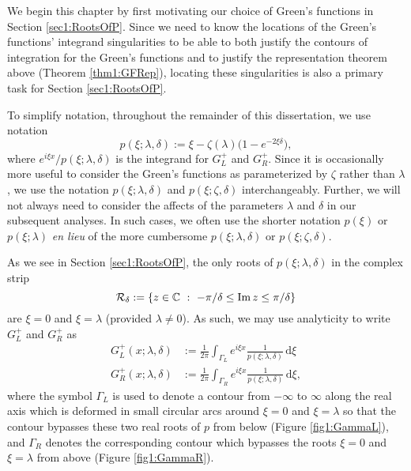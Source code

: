 \documentclass[../dissertation.tex]{subfiles}
\begin{document}
We begin this chapter by first motivating our choice of Green's functions
in Section \ref{sec1:RootsOfP}. 
Since we need to know the locations of the 
Green's functions' integrand singularities to be able to both justify 
the contours of integration for the Green's functions and
to justify the representation theorem above (Theorem \ref{thm1:GFRep}), 
locating these singularities is also a primary task for Section 
\ref{sec1:RootsOfP}.

To simplify notation, throughout the remainder of this dissertation, we use notation
\[
	p(\xi; \lambda, \delta) := \xi - \zeta(\lambda) \big( 1-e^{-2\xi \delta} \big),
	\label{sym:GFintegrand}
\]
where $e^{i\xi x} / p(\xi; \lambda, \delta)$ is the integrand for $G_L^+$ and $G_R^+$.
Since it is occasionally more useful to consider the Green's functions as parameterized 
by $\zeta$ rather than $\lambda$, we use the notation $p(\xi; \lambda, \delta)$ and
$p(\xi; \zeta, \delta)$ interchangeably. Further, we will not always need to consider
the af{}fects of the parameters $\lambda$ and $\delta$ in our subsequent analyses. In 
such cases, we often use the shorter notation $p(\xi)$ or $p(\xi;\lambda)$ \textit{en lieu} 
of the more cumbersome $p(\xi; \lambda, \delta)$ or $p(\xi; \zeta, \delta)$.

As we see in Section \ref{sec1:RootsOfP}, the only roots of $p(\xi; \lambda, \delta)$ 
in the complex strip 
\[
	\mathcal R_\delta := \{z \in \mathbb C ~:~ -\pi/\delta \leq \operatorname{Im} z \leq \pi/\delta \}	
\]
\label{sym1:Rcal}
are $\xi = 0$ and $\xi = \lambda$ (provided $\lambda \ne 0$). As such, we may
use analyticity to write $G_L^+$ and $G_R^+$ as \label{sym:GFbndry}
\begin{align*}
	G_L^+(x; \lambda, \delta)
		&:= 
			\frac{1}{2\pi} 
			\int_{\Gamma_L} 
				e^{i\xi x} \frac{1}{p(\xi; \lambda, \delta)} 
			\, \mathrm{d}\xi \\
	G_R^+(x; \lambda, \delta) 
		&:= 
			\frac{1}{2\pi} 
				\int_{\Gamma_R} 
					e^{i\xi x} \frac{1}{p(\xi; \lambda, \delta)} 
				\, \mathrm{d}\xi,
\end{align*}
where the symbol $\Gamma_L$ \label{sym:Gamma} is used to denote a contour from $-\infty$ to 
$\infty$ along the real axis which is deformed in small circular arcs around 
$\xi = 0$ and $\xi=\lambda$ so that the contour bypasses these two real roots 
of $p$ from below (Figure \ref{fig1:GammaL}), and $\Gamma_R$ denotes the 
corresponding contour which bypasses
the roots $\xi = 0$ and $\xi=\lambda$ from above (Figure \ref{fig1:GammaR}). 
\end{document}

